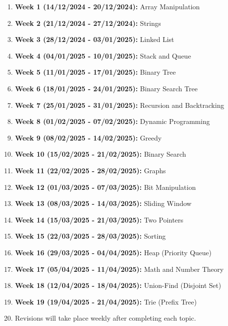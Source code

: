 \documentclass{article}
\begin{document}
\begin{enumerate}[noitemsep]
    \item \textbf{Week 1 (14/12/2024 - 20/12/2024):} Array Manipulation
    \item \textbf{Week 2 (21/12/2024 - 27/12/2024):} Strings
    \item \textbf{Week 3 (28/12/2024 - 03/01/2025):} Linked List
    \item \textbf{Week 4 (04/01/2025 - 10/01/2025):} Stack and Queue
    \item \textbf{Week 5 (11/01/2025 - 17/01/2025):} Binary Tree
    \item \textbf{Week 6 (18/01/2025 - 24/01/2025):} Binary Search Tree
    \item \textbf{Week 7 (25/01/2025 - 31/01/2025):} Recursion and Backtracking
    \item \textbf{Week 8 (01/02/2025 - 07/02/2025):} Dynamic Programming
    \item \textbf{Week 9 (08/02/2025 - 14/02/2025):} Greedy
    \item \textbf{Week 10 (15/02/2025 - 21/02/2025):} Binary Search
    \item \textbf{Week 11 (22/02/2025 - 28/02/2025):} Graphs
    \item \textbf{Week 12 (01/03/2025 - 07/03/2025):} Bit Manipulation
    \item \textbf{Week 13 (08/03/2025 - 14/03/2025):} Sliding Window
    \item \textbf{Week 14 (15/03/2025 - 21/03/2025):} Two Pointers
    \item \textbf{Week 15 (22/03/2025 - 28/03/2025):} Sorting
    \item \textbf{Week 16 (29/03/2025 - 04/04/2025):} Heap (Priority Queue)
    \item \textbf{Week 17 (05/04/2025 - 11/04/2025):} Math and Number Theory
    \item \textbf{Week 18 (12/04/2025 - 18/04/2025):} Union-Find (Disjoint Set)
    \item \textbf{Week 19 (19/04/2025 - 21/04/2025):} Trie (Prefix Tree)
    \item Revisions will take place weekly after completing each topic.
\end{enumerate}
\end{document}
